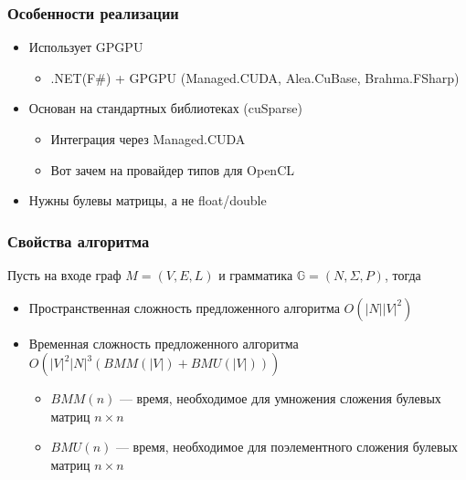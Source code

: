 \documentclass[xcolor=table,aspectratio=169]{beamer}
\begin{document}
\begin{frame}[fragile]
  \transwipe[direction=90]
  \frametitle{Особенности реализации}

\begin{itemize} 
\item Использует GPGPU
\begin{itemize}     
  \item .NET(F\#) + GPGPU (Managed.CUDA, Alea.CuBase, Brahma.FSharp)
\end{itemize}
\item Основан на стандартных библиотеках (cuSparse)
\begin{itemize}     
  \item Интеграция через Managed.CUDA
  \item Вот зачем на провайдер типов для OpenCL 
\end{itemize}
\item Нужны булевы матрицы, а не float/double
\end{itemize}
\end{frame}


\begin{frame}
  \transwipe[direction=90]
  \frametitle{Свойства алгоритма}

Пусть на входе граф $M=(V,E,L)$ и грамматика $\mathbb{G} = (N, \Sigma, P)$, тогда
\begin{itemize} 
\item Пространственная сложность предложенного алгоритма $O(|N||V|^2)$
\item Временная сложность предложенного алгоритма $O(|V|^2 |N|^3(BMM(|V|) + BMU (|V|)))$
\begin{itemize} 
\item $BMM(n)$ --- время, необходимое для умножения сложения булевых матриц $n\times n$
\item $BMU(n)$ --- время, необходимое для поэлементного сложения булевых матриц $n\times n$
\end{itemize}

\end{itemize}

\end{frame}
\end{document}
